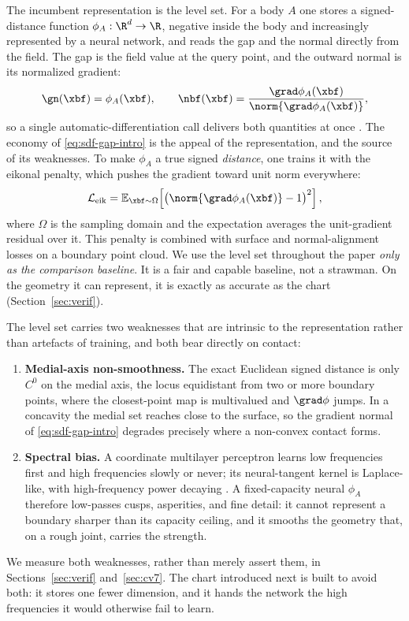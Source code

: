 The incumbent representation is the level set. For a body $A$ one stores a signed-distance function
$\phi_A:\R^d\to\R$, negative inside the body and increasingly represented by a neural network, and reads
the gap and the normal directly from the field. The gap is the field value at the query point, and the
outward normal is its normalized gradient:
\begin{equation}
  \gn(\xbf)=\phi_A(\xbf),\qquad
  \nbf(\xbf)=\frac{\grad\phi_A(\xbf)}{\norm{\grad\phi_A(\xbf)}},
  \label{eq:sdf-gap-intro}
\end{equation}
so a single automatic-differentiation call delivers both quantities at once
\citep{liu2020implicit,kolev2003level}. The economy of \eqref{eq:sdf-gap-intro} is the appeal of the
representation, and the source of its weaknesses. To make $\phi_A$ a true signed \emph{distance}, one
trains it with the eikonal penalty, which pushes the gradient toward unit norm everywhere:
\begin{equation}
  \mathcal{L}_{\mathrm{eik}}
  =\mathbb{E}_{\xbf\sim\Omega}\!\left[\big(\norm{\grad\phi_A(\xbf)}-1\big)^2\right],
  \label{eq:eikonal}
\end{equation}
where $\Omega$ is the sampling domain and the expectation averages the unit-gradient residual over it.
This penalty is combined with surface and normal-alignment losses on a boundary point cloud. We use the
level set throughout the paper \emph{only as the comparison baseline}. It is a fair and capable baseline,
not a strawman. On the geometry it can represent, it is exactly as accurate as the chart
(Section~\ref{sec:verif}).

The level set carries two weaknesses that are intrinsic to the representation rather than artefacts of
training, and both bear directly on contact:
\begin{enumerate}
  \item \textbf{Medial-axis non-smoothness.} The exact Euclidean signed distance is only $C^0$ on the
        medial axis, the locus equidistant from two or more boundary points, where the closest-point map
        is multivalued and $\grad\phi$ jumps. In a concavity the medial set reaches close to the
        surface, so the gradient normal of \eqref{eq:sdf-gap-intro} degrades precisely where a non-convex
        contact forms.
  \item \textbf{Spectral bias.} A coordinate multilayer perceptron learns low frequencies first and high
        frequencies slowly or never; its neural-tangent kernel is Laplace-like, with high-frequency
        power decaying \citep{rahaman2019spectral}. A fixed-capacity neural $\phi_A$ therefore low-passes
        cusps, asperities, and fine detail: it cannot represent a boundary sharper than its capacity
        ceiling, and it smooths the geometry that, on a rough joint, carries the strength.
\end{enumerate}
We measure both weaknesses, rather than merely assert them, in Sections~\ref{sec:verif}
and~\ref{sec:cv7}. The chart introduced next is built to avoid both: it stores one fewer
dimension, and it hands the network the high frequencies it would otherwise fail to learn.

